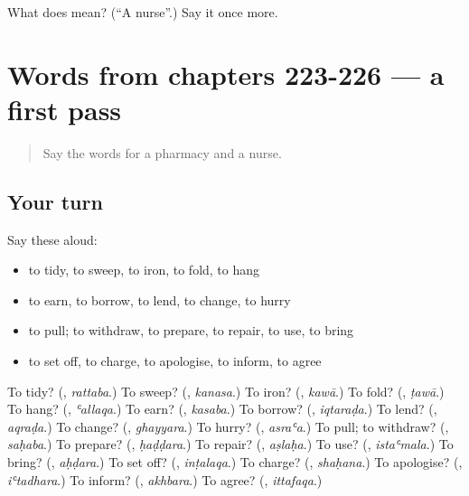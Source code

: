 \begin{tcolorbox}[breakable,colback=teal!4,colframe=teal!35!black,title={Before you move on}]
What does  mean? (\textquotedblleft{}A nurse\textquotedblright{}.) Say it once more.
\end{tcolorbox}
\section[(dialogue)]{Words from chapters 223-226 — a first pass}

\label{lesson:AR-R231-first-pass-words-from-chapters-223-226}



\begin{quote}
Say the words for a pharmacy and a nurse.
\end{quote}

\subsection*{Your turn}
Say these aloud:

\begin{itemize}
\raggedright
  \item to tidy, to sweep, to iron, to fold, to hang
  \item to earn, to borrow, to lend, to change, to hurry
  \item to pull; to withdraw, to prepare, to repair, to use, to bring
  \item to set off, to charge, to apologise, to inform, to agree
\end{itemize}

\begin{tcolorbox}[breakable,colback=teal!4,colframe=teal!35!black,title={Before you move on}]
To tidy? (\textbf{}, \emph{rattaba}.) To sweep? (\textbf{}, \emph{kanasa}.) To iron? (\textbf{}, \emph{kawā}.) To fold? (\textbf{}, \emph{ṭawā}.) To hang? (\textbf{}, \emph{ʿallaqa}.) To earn? (\textbf{}, \emph{kasaba}.) To borrow? (\textbf{}, \emph{iqtaraḍa}.) To lend? (\textbf{}, \emph{aqraḍa}.) To change? (\textbf{}, \emph{ghayyara}.) To hurry? (\textbf{}, \emph{asraʿa}.) To pull; to withdraw? (\textbf{}, \emph{saḥaba}.) To prepare? (\textbf{}, \emph{ḥaḍḍara}.) To repair? (\textbf{}, \emph{aṣlaḥa}.) To use? (\textbf{}, \emph{istaʿmala}.) To bring? (\textbf{}, \emph{aḥḍara}.) To set off? (\textbf{}, \emph{inṭalaqa}.) To charge? (\textbf{}, \emph{shaḥana}.) To apologise? (\textbf{}, \emph{iʿtadhara}.) To inform? (\textbf{}, \emph{akhbara}.) To agree? (\textbf{}, \emph{ittafaqa}.)
\end{tcolorbox}
